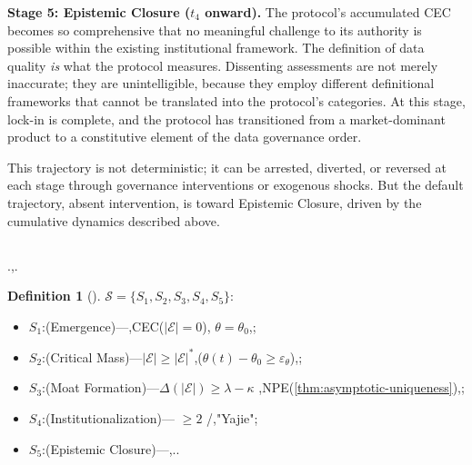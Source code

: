 \documentclass[12pt,a4paper]{article}
\theoremstyle{definition}
\newtheorem{definition}{Definition}[section]
\theoremstyle{remark}
\begin{document}
\textbf{Stage 5: Epistemic Closure ($t_4$ onward).} The protocol's accumulated CEC becomes so comprehensive that no meaningful challenge to its authority is possible within the existing institutional framework. The definition of data quality \textit{is} what the protocol measures. Dissenting assessments are not merely inaccurate; they are unintelligible, because they employ different definitional frameworks that cannot be translated into the protocol's categories. At this stage, lock-in is complete, and the protocol has transitioned from a market-dominant product to a constitutive element of the data governance order.

This trajectory is not deterministic; it can be arrested, diverted, or reversed at each stage through governance interventions or exogenous shocks. But the default trajectory, absent intervention, is toward Epistemic Closure, driven by the cumulative dynamics described above.

\subsection{}

.,.

\begin{definition}[]
\label{def:markov-states}
 $\mathcal{S} = \{S_1, S_2, S_3, S_4, S_5\}$:
\begin{itemize}[itemsep=2pt]
\item $S_1$:\textbf{}(Emergence)---,CEC($|\mathcal{E}| = 0$), $\theta = \theta_0$,;
\item $S_2$:\textbf{}(Critical Mass)---$|\mathcal{E}| \geq |\mathcal{E}|^*$,($\theta(t) - \theta_0 \geq \varepsilon_\theta$),;
\item $S_3$:\textbf{}(Moat Formation)---$\Delta(|\mathcal{E}|) \geq \lambda - \kappa$ ,NPE(\ref{thm:asymptotic-uniqueness}),;
\item $S_4$:\textbf{}(Institutionalization)--- $\geq 2$ /,"Yajie";
\item $S_5$:\textbf{}(Epistemic Closure)---,..
\end{itemize}
\end{definition}
\end{document}

